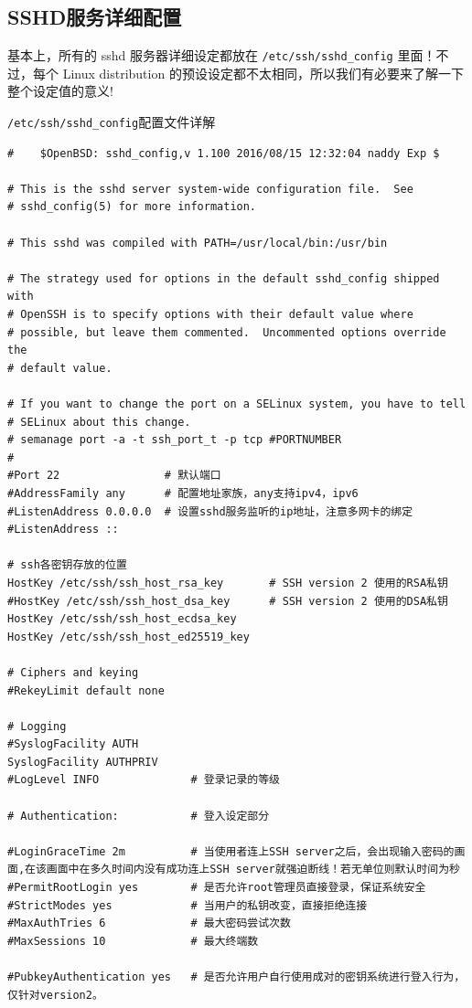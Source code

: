 \subsection{SSHD服务详细配置}
基本上，所有的 sshd 服务器详细设定都放在 \texttt{/etc/ssh/sshd\_config} 里面！不过，每个 Linux distribution 的预设设定都不太相同，所以我们有必要来了解一下整个设定值的意义!
\begin{ascboxB}{\texttt{/etc/ssh/sshd_config}配置文件详解}
\begin{verbatim}
#    $OpenBSD: sshd_config,v 1.100 2016/08/15 12:32:04 naddy Exp $

# This is the sshd server system-wide configuration file.  See
# sshd_config(5) for more information.

# This sshd was compiled with PATH=/usr/local/bin:/usr/bin

# The strategy used for options in the default sshd_config shipped with
# OpenSSH is to specify options with their default value where
# possible, but leave them commented.  Uncommented options override the
# default value.

# If you want to change the port on a SELinux system, you have to tell
# SELinux about this change.
# semanage port -a -t ssh_port_t -p tcp #PORTNUMBER
#
#Port 22                # 默认端口
#AddressFamily any      # 配置地址家族，any支持ipv4，ipv6
#ListenAddress 0.0.0.0  # 设置sshd服务监听的ip地址，注意多网卡的绑定
#ListenAddress ::

# ssh各密钥存放的位置
HostKey /etc/ssh/ssh_host_rsa_key       # SSH version 2 使用的RSA私钥
#HostKey /etc/ssh/ssh_host_dsa_key      # SSH version 2 使用的DSA私钥
HostKey /etc/ssh/ssh_host_ecdsa_key     
HostKey /etc/ssh/ssh_host_ed25519_key

# Ciphers and keying
#RekeyLimit default none

# Logging
#SyslogFacility AUTH
SyslogFacility AUTHPRIV
#LogLevel INFO              # 登录记录的等级

# Authentication:           # 登入设定部分

#LoginGraceTime 2m          # 当使用者连上SSH server之后，会出现输入密码的画面,在该画面中在多久时间内没有成功连上SSH server就强迫断线！若无单位则默认时间为秒
#PermitRootLogin yes        # 是否允许root管理员直接登录，保证系统安全
#StrictModes yes            # 当用户的私钥改变，直接拒绝连接
#MaxAuthTries 6             # 最大密码尝试次数
#MaxSessions 10             # 最大终端数

#PubkeyAuthentication yes   # 是否允许用户自行使用成对的密钥系统进行登入行为，仅针对version2。


\end{verbatim}
\end{ascboxB}
